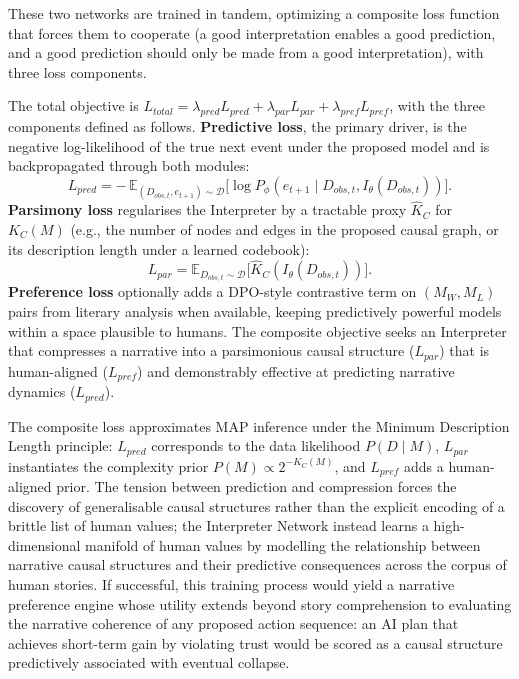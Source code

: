 \documentclass{article}
\theoremstyle{plain}
\theoremstyle{definition}
\theoremstyle{remark}
\begin{document}
These two networks are trained in tandem, optimizing a composite loss function that forces them to cooperate (a good interpretation enables a good prediction, and a good prediction should only be made from a good interpretation), with three loss components.

The total objective is $L_{total} = \lambda_{pred}L_{pred} + \lambda_{par}L_{par} + \lambda_{pref}L_{pref}$, with the three components defined as follows. \textbf{Predictive loss}, the primary driver, is the negative log-likelihood of the true next event under the proposed model and is backpropagated through both modules:
\begin{equation}
L_{pred} = -\,\mathbb{E}_{(D_{obs, t}, e_{t+1}) \sim \mathcal{D}}\bigl[\log P_\phi(e_{t+1} \mid D_{obs, t}, I_\theta(D_{obs, t}))\bigr].
\end{equation}
\textbf{Parsimony loss} regularises the Interpreter by a tractable proxy $\hat{K}_C$ for $K_C(M)$ (e.g., the number of nodes and edges in the proposed causal graph, or its description length under a learned codebook):
\begin{equation}
L_{par} = \mathbb{E}_{D_{obs, t} \sim \mathcal{D}}\bigl[\hat{K}_C(I_\theta(D_{obs, t}))\bigr].
\end{equation}
\textbf{Preference loss} optionally adds a DPO-style contrastive term on $(M_W, M_L)$ pairs from literary analysis when available, keeping predictively powerful models within a space plausible to humans. The composite objective seeks an Interpreter that compresses a narrative into a parsimonious causal structure ($L_{par}$) that is human-aligned ($L_{pref}$) and demonstrably effective at predicting narrative dynamics ($L_{pred}$).

The composite loss approximates MAP inference under the Minimum Description Length principle: $L_{pred}$ corresponds to the data likelihood $P(D \mid M)$, $L_{par}$ instantiates the complexity prior $P(M) \propto 2^{-K_C(M)}$, and $L_{pref}$ adds a human-aligned prior. The tension between prediction and compression forces the discovery of generalisable causal structures rather than the explicit encoding of a brittle list of human values; the Interpreter Network instead learns a high-dimensional manifold of human values by modelling the relationship between narrative causal structures and their predictive consequences across the corpus of human stories. If successful, this training process would yield a narrative preference engine whose utility extends beyond story comprehension to evaluating the narrative coherence of any proposed action sequence: an AI plan that achieves short-term gain by violating trust would be scored as a causal structure predictively associated with eventual collapse.
\end{document}
